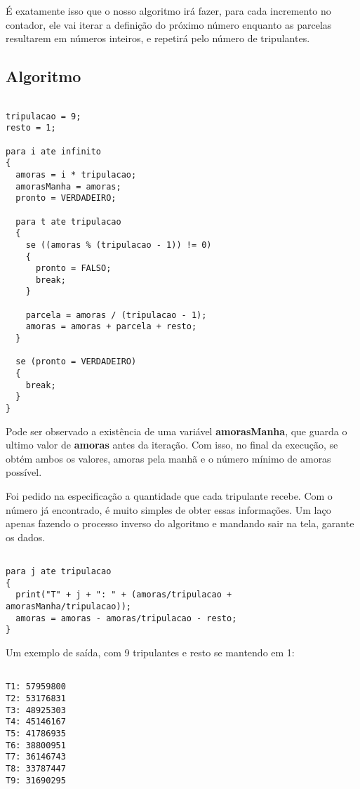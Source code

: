 \documentclass[12pt]{article}
\begin{document}
É exatamente isso que o nosso algoritmo irá fazer, para cada incremento no contador, ele vai iterar a definição do próximo número enquanto as parcelas resultarem em números inteiros, e repetirá pelo número de tripulantes.

\subsection{Algoritmo}

\begin{lstlisting}

tripulacao = 9;
resto = 1;

para i ate infinito
{
  amoras = i * tripulacao;
  amorasManha = amoras;
  pronto = VERDADEIRO;

  para t ate tripulacao
  {
    se ((amoras % (tripulacao - 1)) != 0)
    {
      pronto = FALSO;
      break;
    }

    parcela = amoras / (tripulacao - 1);
    amoras = amoras + parcela + resto;
  }

  se (pronto = VERDADEIRO)
  {
    break;
  }
}

\end{lstlisting}

Pode ser observado a existência de uma variável \textbf{amorasManha}, que guarda o ultimo valor de \textbf{amoras} antes da iteração.  Com isso, no final da execução, se obtém ambos os valores, amoras pela manhã e o número mínimo de amoras possível.

Foi pedido na especificação a quantidade que cada tripulante recebe. Com o número já encontrado, é muito simples de obter essas informações. Um laço apenas fazendo o processo inverso do algoritmo e mandando sair na tela, garante os dados.

\begin{lstlisting}

para j ate tripulacao
{
  print("T" + j + ": " + (amoras/tripulacao + amorasManha/tripulacao));
  amoras = amoras - amoras/tripulacao - resto;
}

\end{lstlisting}

Um exemplo de saída, com 9 tripulantes e resto se mantendo em 1:

\begin{lstlisting}

T1: 57959800
T2: 53176831
T3: 48925303
T4: 45146167
T5: 41786935
T6: 38800951
T7: 36146743
T8: 33787447
T9: 31690295

\end{lstlisting}
\end{document}
